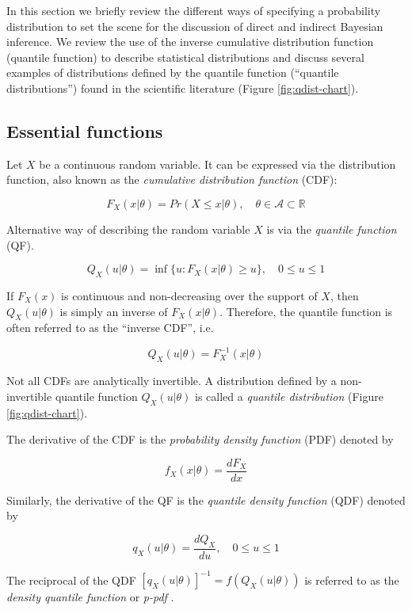 \documentclass[
  12pt,
]{article}
\begin{document}
In this section we briefly review the different ways of specifying a probability distribution to set the scene for the discussion of direct and indirect Bayesian inference. We review the use of the inverse cumulative distribution function (quantile function) to describe statistical distributions and discuss several examples of distributions defined by the quantile function (``quantile distributions'') found in the scientific literature (Figure \ref{fig:qdist-chart}).

\hypertarget{essential-functions}{%
\subsection{Essential functions}\label{essential-functions}}

Let \(X\) be a continuous random variable. It can be expressed via the distribution function, also known as the \emph{cumulative distribution function} (CDF):

\[
F_X(x | \theta)=Pr(X \leq x | \theta), \quad \theta \in \mathcal A \subset \mathbb R
\]

Alternative way of describing the random variable \(X\) is via the \emph{quantile function} (QF).

\[
Q_X(u | \theta)=\inf\{u:F_X(x|\theta)\geq u\}, \quad 0 \leq u\leq 1
\]

If \(F_X(x)\) is continuous and non-decreasing over the support of \(X\), then \(Q_X(u|\theta)\) is simply an inverse of \(F_X(x|\theta)\). Therefore, the quantile function is often referred to as the ``inverse CDF'', i.e.~

\[
Q_X(u | \theta)=F_X^{-1}(x|\theta)
\]

Not all CDFs are analytically invertible. A distribution defined by a non-invertible quantile function \(Q_X(u | \theta)\) is called a \emph{quantile distribution} (Figure \ref{fig:qdist-chart}).

The derivative of the CDF is the \emph{probability density function} (PDF) denoted by

\[
f_X(x | \theta)=\frac{dF_X}{dx}
\]

Similarly, the derivative of the QF is the \emph{quantile density function} (QDF) denoted by

\[
q_X(u|\theta)=\frac{dQ_X}{du}, \quad 0 \leq u \leq 1
\]

The reciprocal of the QDF \([q_X(u|\theta)]^{-1}=f(Q_X(u|\theta))\) is referred to as the \emph{density quantile function} \citep{parzen1980DataModelingUsing} or \emph{p-pdf} \citep{gilchrist2000StatisticalModellingQuantile}.
\end{document}
